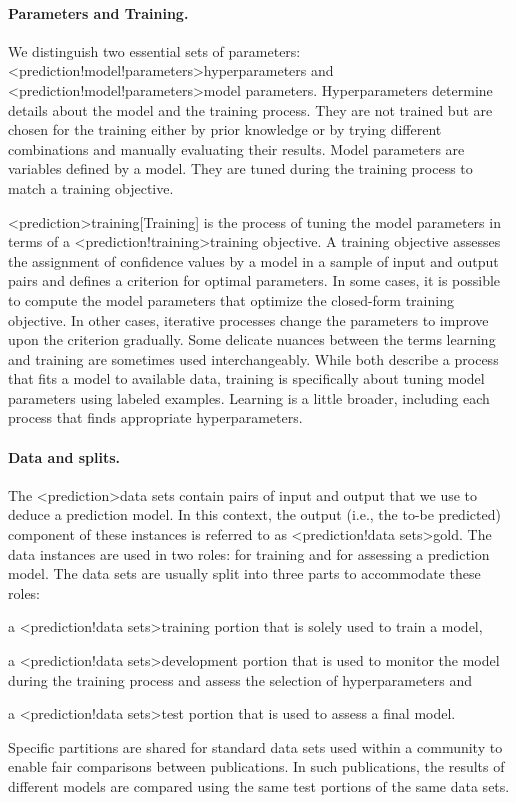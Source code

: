 \documentclass[../document.tex]{subfiles}
\begin{document}
    \paragraph{Parameters and Training.}
    We distinguish two essential sets of parameters: <prediction!model!parameters>{hyperparameters} and <prediction!model!parameters>{model parameters}.
    Hyperparameters determine details about the model and the training process. %
    They are not trained but are chosen for the training either by prior knowledge or by trying different combinations and manually evaluating their results.
    Model parameters are variables defined by a model. They are tuned during the training process to match a training objective.

    <prediction>{training}[Training] is the process of tuning the model parameters in terms of a <prediction!training>{training objective}.
    A training objective assesses the assignment of confidence values by a model in a sample of input and output pairs and defines a criterion for optimal parameters.
    In some cases, it is possible to compute the model parameters that optimize the closed-form training objective.
    In other cases, iterative processes change the parameters to improve upon the criterion gradually.
    Some delicate nuances between the terms learning and training are sometimes used interchangeably.
    While both describe a process that fits a model to available data, training is specifically about tuning model parameters using labeled examples.
    Learning is a little broader, including each process that finds appropriate hyperparameters.


    \paragraph{Data and splits.}
    The <prediction>{data sets} contain pairs of input and output that we use to deduce a prediction model.
    In this context, the output (i.e., the to-be predicted) component of these instances is referred to as <prediction!data sets>{gold}.
    The data instances are used in two roles: for training and for assessing a prediction model.
    The data sets are usually split into three parts to accommodate these roles:
    \begin{inparaenum}
        \item a <prediction!data sets>{training portion} that is solely used to train a model,
        \item a <prediction!data sets>{development portion} that is used to monitor the model during the training process and assess the selection of hyperparameters and
        \item a <prediction!data sets>{test portion} that is used to assess a final model.
    \end{inparaenum}
    Specific partitions are shared for standard data sets used within a community to enable fair comparisons between publications.
    In such publications, the results of different models are compared using the same test portions of the same data sets.
\end{document}

